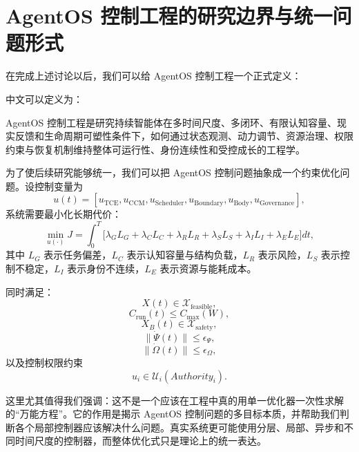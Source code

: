 \section{AgentOS 控制工程的研究边界与统一问题形式}

在完成上述讨论以后，我们可以给 AgentOS 控制工程一个正式定义：

\begin{statementbox}
\centering
{}
\end{statementbox}

中文可以定义为：

\begin{definition*}
AgentOS 控制工程是研究持续智能体在多时间尺度、多闭环、有限认知容量、现实反馈和生命周期可塑性条件下，如何通过状态观测、动力调节、资源治理、权限约束与恢复机制维持整体可运行性、身份连续性和受控成长的工程学。
\end{definition*}

为了使后续研究能够统一，我们可以把 AgentOS 控制问题抽象成一个约束优化问题。设控制变量为
\[
u(t)
=
[
u_{\mathrm{TCE}},
u_{\mathrm{CCM}},
u_{\mathrm{Scheduler}},
u_{\mathrm{Boundary}},
u_{\mathrm{Body}},
u_{\mathrm{Governance}}
],
\]
系统需要最小化长期代价：
\[
\min_{u(\cdot)}
J
=
\int_0^T
\Big[
\lambda_G L_G
+
\lambda_C L_C
+
\lambda_R L_R
+
\lambda_S L_S
+
\lambda_I L_I
+
\lambda_E L_E
\Big]dt,
\]
其中 $L_G$ 表示任务偏差，$L_C$ 表示认知容量与结构负载，$L_R$ 表示风险，$L_S$ 表示控制不稳定，$L_I$ 表示身份不连续，$L_E$ 表示资源与能耗成本。

同时满足：
\[
X(t)\in\mathcal X_{\mathrm{feasible}},
\]
\[
C_{\mathrm{run}}(t)
\le
C_{\max}(W),
\]
\[
X_B(t)\in\mathcal X_{\mathrm{safety}},
\]
\[
\|\dot\Psi(t)\|
\le
\epsilon_\Psi,
\]
\[
\|\dot\Omega(t)\|
\le
\epsilon_\Omega,
\]
以及控制权限约束
\[
u_i
\in
\mathcal U_i(
Authority_i
).
\]

这里尤其值得我们强调：这不是一个应该在工程中真的用单一优化器一次性求解的“万能方程”。它的作用是揭示 AgentOS 控制问题的多目标本质，并帮助我们判断各个局部控制器应该解决什么问题。真实系统更可能使用分层、局部、异步和不同时间尺度的控制器，而整体优化式只是理论上的统一表达。

